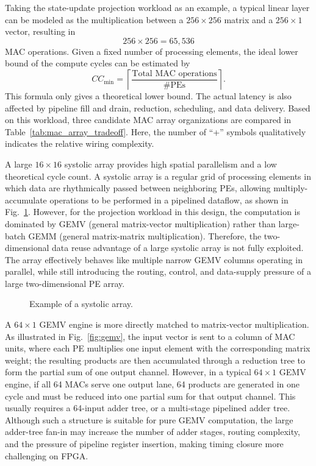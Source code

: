 \documentclass[11pt,twoside]{eitExjobb}
\begin{document}
Taking the state-update projection workload as an example, a typical linear layer can be modeled as the
multiplication between a $256\times256$ matrix and a $256\times1$ vector, resulting in
\begin{equation}
256 \times 256 = 65,536
\label{eq:total_mac_ops}
\end{equation}
MAC operations. Given a fixed number of processing elements, the ideal lower bound of
the compute cycles can be estimated by
\begin{equation}
CC_{\min} =
\left\lceil
\frac{\text{Total MAC operations}}{\#\text{PEs}}
\right\rceil .
\label{eq:cc_min}
\end{equation}
This formula only gives a theoretical lower bound. The actual latency is also affected
by pipeline fill and drain, reduction, scheduling, and data delivery. Based on this
workload, three candidate MAC array organizations are compared in
Table~\ref{tab:mac_array_tradeoff}. Here, the number of ``+'' symbols qualitatively
indicates the relative wiring complexity.

A large $16\times16$ systolic array provides high spatial parallelism and a low
theoretical cycle count. A systolic array is a regular grid of processing
elements in which data are rhythmically passed between neighboring PEs, allowing
multiply-accumulate operations to be performed in a pipelined dataflow, as shown in Fig.~\ref{fig:systolic}. However, for the projection workload in this design, the
computation is dominated by GEMV (general matrix-vector multiplication) rather than large-batch GEMM (general matrix-matrix multiplication). Therefore, the
two-dimensional data reuse advantage of a large systolic array is not fully exploited. The array effectively behaves like
multiple narrow GEMV columns operating in parallel, while still introducing the
routing, control, and data-supply pressure of a large two-dimensional PE array.

\begin{figure}[H]
  \centering
  
  \caption{Example of a systolic array.}
  \label{fig:systolic}
\end{figure}

A $64\times1$ GEMV engine is more directly matched to matrix-vector multiplication. As illustrated in Fig.~\ref{fig:gemv}, the input vector
is sent to a column of MAC units, where each PE multiplies one input
element with the corresponding matrix weight; the resulting products are then
accumulated through a reduction tree to form the partial sum of one output
channel.
However, in a typical $64\times1$ GEMV engine, if all 64 MACs serve one output lane, 64
products are generated in one cycle and must be reduced into one partial sum for that
output channel. This usually requires a 64-input adder tree, or a multi-stage pipelined
adder tree. Although such a structure is suitable for pure GEMV computation, the large
adder-tree fan-in may increase the number of adder stages, routing complexity, and the
pressure of pipeline register insertion, making timing closure more challenging on
FPGA.
\end{document}
